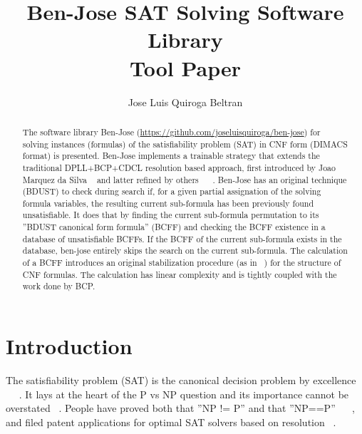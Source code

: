\documentclass{easychair}
\title{Ben-Jose SAT Solving Software Library\\
       Tool Paper}
\author{
Jose Luis Quiroga Beltran
}
\institute{
	Independent Researcher\thanks{Especial thanks to our heavenly Father YHWH, his anointed King, Magda Beltran de Quiroga and Federman Quiroga.}\\
	\email{joseluisquiroga@yahoo.com}\\
	March 2016
 }
\begin{document}
\maketitle

\begin{abstract}
The software library Ben-Jose (\url{https://github.com/joseluisquiroga/ben-jose}) for solving instances (formulas) of the satisfiability problem (SAT) in CNF form (DIMACS format) is presented. Ben-Jose implements a trainable strategy that extends the traditional DPLL+BCP+CDCL resolution based approach, first introduced by Joao Marquez da Silva ~\cite{silva-95} and latter refined by others ~\cite{moskewicz-01} ~\cite{een-04}. Ben-Jose has an original technique (BDUST) to check during search if, for a given partial assignation of the solving formula variables, the resulting current sub-formula has been previously found unsatisfiable. It does that by finding the current sub-formula permutation to its ''BDUST canonical form formula'' (BCFF) and checking the BCFF existence in a database of unsatisfiable BCFFs. If the BCFF of the current sub-formula exists in the database, ben-jose entirely skips the search on the current sub-formula. The calculation of a BCFF introduces an original stabilization procedure (as in ~\cite{bastert-02}) for the structure of CNF formulas. The calculation has linear complexity and is tightly coupled with the work done by BCP.
\end{abstract}


\setcounter{tocdepth}{2}
{\small
\tableofcontents}

%
%


\section{Introduction}
\label{sect:introduction}

The satisfiability problem (SAT) is the canonical decision problem by excellence ~\cite{biere-09} ~\cite{kroening-08} ~\cite{marek-09}. It lays at the heart of the P vs NP question and its importance cannot be overstated ~\cite{cook-09}. People have proved both that ''NP != P'' and that ''NP==P'' ~\cite{woeginger-16} ~\cite{muller-13}, and filed patent applications for optimal SAT solvers based on resolution ~\cite{quiroga-01}. 
\end{document}
